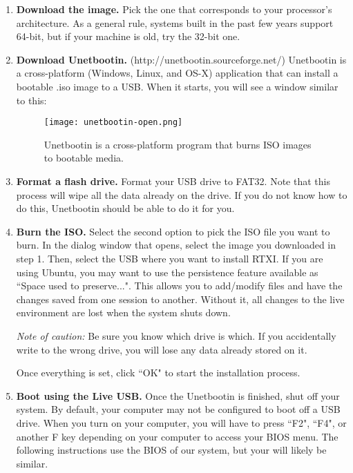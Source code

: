 \begin{enumerate}
\item \textbf{Download the image.} Pick the one that corresponds to your processor's architecture. As a general rule, systems built in the past few years support 64-bit, but if your machine is old, try the 32-bit one. 

\item \textbf{Download Unetbootin.} (http://unetbootin.sourceforge.net/) Unetbootin is a cross-platform (Windows, Linux, and OS-X) application that can install a bootable .iso image to a USB. When it starts, you will see a window similar to this:

\begin{figure}[h]
\begin{center}
\texttt{[image: unetbootin-open.png]}
\caption[Unetbootin]{Unetbootin is a cross-platform program that burns ISO images to bootable media.}
\end{center}
\end{figure}

\item \textbf{Format a flash drive.} Format your USB drive to FAT32. Note that this process will wipe all the data already on the drive. If you do not know how to do this, Unetbootin should be able to do it for you. 

\item \textbf{Burn the ISO.} Select the second option to pick the ISO file you want to burn. In the dialog window that opens, select the image you downloaded in step 1. Then, select the USB where you want to install RTXI. If you are using Ubuntu, you may want to use the persistence feature available as ``Space used to preserve...". This allows you to add/modify files and have the changes saved from one session to another. Without it, all changes to the live environment are lost when the system shuts down.

\textit{Note of caution:} Be sure you know which drive is which. If you accidentally write to the wrong drive, you will lose any data already stored on it. 

Once everything is set, click ``OK" to start the installation process. 

\item \textbf{Boot using the Live USB.} Once the Unetbootin is finished, shut off your system. By default, your computer may not be configured to boot off a USB drive. When you turn on your computer, you will have to press ``F2", ``F4", or another F key depending on your computer to access your BIOS menu. The following instructions use the BIOS of our system, but your will likely be similar. 


\end{enumerate}
